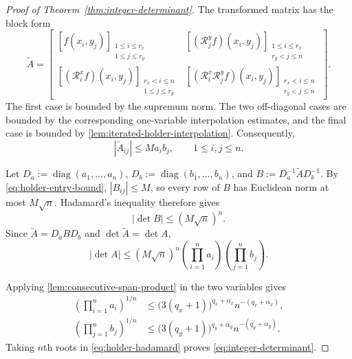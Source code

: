 \documentclass[11pt]{article}
\theoremstyle{definition}
\theoremstyle{remark}
\newcommand{\abs}[1]{\left\lvert #1\right\rvert}
\begin{document}
\begin{proof}[Proof of Theorem~\ref{thm:integer-determinant}]
The transformed matrix has the block form
\[
    \widetilde A
    =
    \left[
    \begin{array}{c|c}
      [f(x_i,y_j)]_
      {\substack{1\le i\le r_x\\1\le j\le r_y}}
      &
      [(\mathcal R_j^y f)(x_i,y_j)]_
      {\substack{1\le i\le r_x\\r_y<j\le n}}
      \\ \hline
      [(\mathcal R_i^x f)(x_i,y_j)]_
      {\substack{r_x<i\le n\\1\le j\le r_y}}
      &
      [(\mathcal R_i^x\mathcal R_j^y f)(x_i,y_j)]_
      {\substack{r_x<i\le n\\r_y<j\le n}}
    \end{array}
    \right].
\]
The first case is bounded by the supremum norm. The two off-diagonal
cases are bounded by the corresponding one-variable interpolation
estimates, and the final case is bounded by
\cref{lem:iterated-holder-interpolation}. Consequently,
\begin{equation}
    \abs{\widetilde A_{ij}}
    \le
    Ma_ib_j,
    \qquad
    1\le i,j\le n.
    \label{eq:holder-entry-bound}
\end{equation}

Let $D_a:=\operatorname{diag}(a_1,\ldots,a_n)$,
$D_b:=\operatorname{diag}(b_1,\ldots,b_n)$, and
$B:=D_a^{-1}\widetilde A D_b^{-1}$. By
\eqref{eq:holder-entry-bound}, $\abs{B_{ij}}\le M$, so every row of $B$
has Euclidean norm at most $M\sqrt n$. Hadamard's inequality therefore
gives
\[
    \abs{\det B}\le(M\sqrt n)^n.
\]
Since $\widetilde A=D_aBD_b$ and $\det\widetilde A=\det A$,
\begin{equation}
    \abs{\det A}
    \le
    (M\sqrt n)^n
    \left(\prod_{i=1}^n a_i\right)
    \left(\prod_{j=1}^n b_j\right).
    \label{eq:holder-hadamard}
\end{equation}

Applying \cref{lem:consecutive-span-product} in the two variables gives
\[
\begin{aligned}
    \left(\prod_{i=1}^n a_i\right)^{1/n}
    &\le
    \bigl(3(q_x+1)\bigr)^{q_x+\alpha_x}
    n^{-(q_x+\alpha_x)},\\
    \left(\prod_{j=1}^n b_j\right)^{1/n}
    &\le
    \bigl(3(q_y+1)\bigr)^{q_y+\alpha_y}
    n^{-(q_y+\alpha_y)}.
\end{aligned}
\]
Taking $n$th roots in \eqref{eq:holder-hadamard} proves
\eqref{eq:integer-determinant}.
\end{proof}
\end{document}
